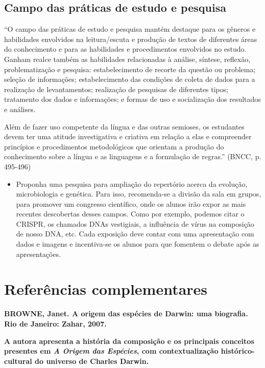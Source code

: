 \documentclass[12pt]{extarticle}
\begin{document}
\subsection{Campo das práticas de estudo e pesquisa}

``O campo das práticas de estudo e pesquisa mantém destaque para os
gêneros e habilidades envolvidos na leitura/escuta e produção de textos
de diferentes áreas do conhecimento e para as habilidades e
procedimentos envolvidos no estudo. Ganham realce também as habilidades
relacionadas à análise, síntese, reflexão, problematização e pesquisa:
estabelecimento de recorte da questão ou problema; seleção de
informações; estabelecimento das condições de coleta de dados para a
realização de levantamentos; realização de pesquisas de diferentes
tipos; tratamento dos dados e informações; e formas de uso e
socialização dos resultados e análises.

Além de fazer uso competente da língua e das outras semioses, os
estudantes devem ter uma atitude investigativa e criativa em relação a
elas e compreender princípios e procedimentos metodológicos que orientam
a produção do conhecimento sobre a língua e as linguagens e a formulação
de regras.'' (BNCC, p. 495-496)

\begin{itemize}
\item
  Proponha uma pesquisa para ampliação do repertório acerca da evolução,
  microbiologia e genética. Para isso, recomenda-se a divisão da sala em
  grupos, para promover um congresso científico, onde os alunos irão
  expor as mais recentes descobertas desses campos. Como por exemplo,
  podemos citar o CRISPR, os chamados DNAs vestigiais, a influência de
  vírus na composição de nosso DNA, etc. Cada exposição deve contar com
  uma apresentação com dados e imagens e incentiva-se os alunos para que
  fomentem o debate após as apresentações.
\end{itemize}


\section{Referências complementares}

\textbf{BROWNE, Janet. A origem das espécies de Darwin: uma biografia.
Rio de Janeiro: Zahar, 2007.}

\textbf{A autora apresenta a história da composição e os principais
conceitos presentes em \emph{A Origem das Espécies}, com
contextualização histórico-cultural do universo de Charles Darwin.}
\end{document}
